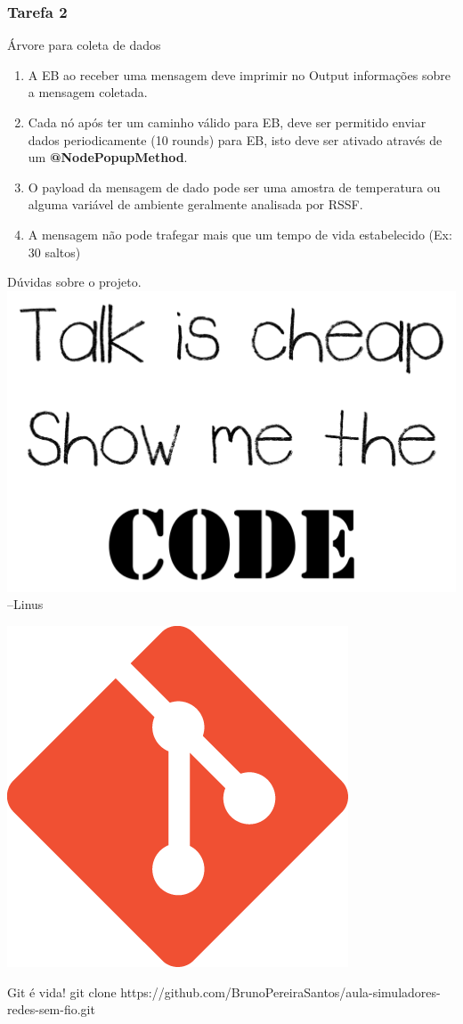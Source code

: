 \documentclass{beamer}
\begin{document}
\begin{frame}
	\frametitle{Tarefa 2}
	\begin{alertblock}{Árvore para coleta de dados}
		\begin{enumerate}

			\item A EB ao receber uma mensagem deve imprimir no Output informações sobre a mensagem coletada.

			\item Cada nó após ter um caminho válido para EB, deve ser permitido enviar dados periodicamente (10 rounds) para EB, isto deve ser ativado através de um \textbf{@NodePopupMethod}.

			\item O payload da mensagem de dado pode ser uma amostra de temperatura ou alguma variável de ambiente geralmente analisada por RSSF.

			\item A mensagem não pode trafegar mais que um tempo de vida estabelecido (Ex: 30 saltos)
		\end{enumerate}
	\end{alertblock}
\end{frame}


\begin{frame}{Dúvidas sobre o projeto.}
	\centering
	\includegraphics[width=.6\linewidth]{img/torvalds.png}
	\flushright
	--Linus
\end{frame}
\begin{frame}
\footnotesize
\centering

	\includegraphics[width=0.22\linewidth]{img/git.png}
	\begin{exampleblock}{Git é vida!}
		git clone https://github.com/BrunoPereiraSantos/aula-simuladores-redes-sem-fio.git
	\end{exampleblock}

\end{frame}
\end{document}
